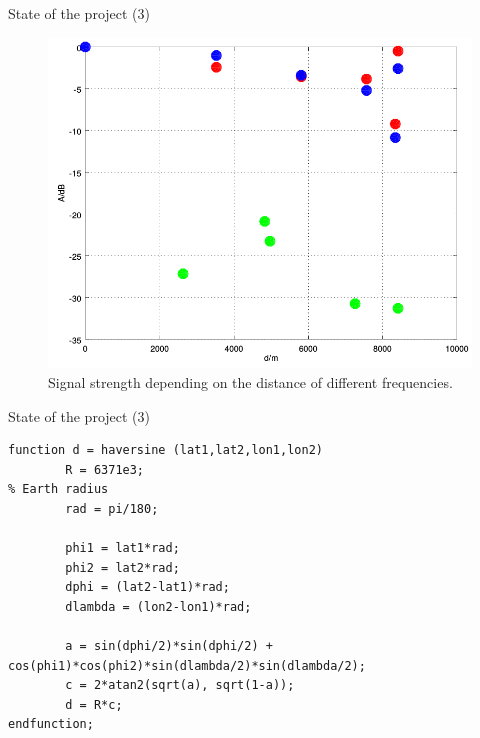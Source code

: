 \documentclass[apectratio=169]{beamer}
\begin{document}
\begin{frame}{State of the project (3)}
\begin{figure}[H]	
		\centering
		\includegraphics[height=0.75\textheight]{./fig/haversine}
		\caption{Signal strength depending on the distance of different frequencies.}
\end{figure}
\end{frame}

\begin{frame}[fragile]{State of the project (3)}
\begin{verbatim}
function d = haversine (lat1,lat2,lon1,lon2)
        R = 6371e3;                                                     % Earth radius
        rad = pi/180;

        phi1 = lat1*rad;
        phi2 = lat2*rad;
        dphi = (lat2-lat1)*rad;
        dlambda = (lon2-lon1)*rad;

        a = sin(dphi/2)*sin(dphi/2) + cos(phi1)*cos(phi2)*sin(dlambda/2)*sin(dlambda/2);
        c = 2*atan2(sqrt(a), sqrt(1-a));
        d = R*c;
endfunction;
\end{verbatim}
\end{frame}
\end{document}
